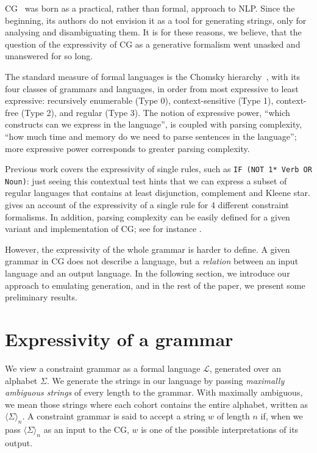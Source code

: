 \documentclass[11pt]{article}
\def\maxAmb#1{$\langle \Sigma \rangle_#1$}
\begin{document}
CG~\cite{karlsson1995constraint} was born as a practical, rather than formal, 
approach to NLP. 
Since the beginning, its authors do not envision it as a tool for 
generating strings, only for analysing and disambiguating them.
It is for these reasons, we believe, that the question of the expressivity of CG
as a generative formalism went unasked and unanswered for so long.

The standard measure of formal languages is the Chomsky hierarchy~\cite{chomsky1956hierarchy}, with its four
classes of grammars and languages, in order from most expressive to least expressive:
recursively enumerable (Type 0), context-sensitive (Type 1), context-free (Type 2), and
regular (Type 3).
The notion of expressive power, ``which constructs can we express in the language'', is coupled with parsing complexity, ``how much time and memory do we need to parse sentences in the language''; more expressive power corresponds to greater parsing complexity.

Previous work covers the expressivity of single rules, such as \texttt{IF (NOT 1* Verb OR Noun)}: 
just seeing this contextual test hints that we can express a subset of 
regular languages that contains at least disjunction, complement and 
Kleene star.  gives an account of the expressivity of 
a single rule for 4 different constraint formalisms. In addition, parsing 
complexity can be easily defined for a given variant and implementation of CG; 
see for instance .

However, the expressivity of the whole grammar is harder to define. 
A given grammar in CG does not describe a language, but a \emph{relation} 
between an input language and an output language. In the following section, 
we introduce our approach to emulating generation, and in the rest of the 
paper, we present some preliminary results.

\section{Expressivity of a grammar}

We view a constraint grammar as a formal language $\mathcal{L}$, generated over an 
alphabet $\Sigma$. We generate the strings in our language by passing \emph{maximally 
ambiguous strings} of every length to the grammar. 
With maximally ambiguous, we mean those strings where each cohort contains the 
entire alphabet, written as \maxAmb{n}. 
A constraint grammar is said to accept a string $w$ of length $n$ if, 
when we pass \maxAmb{n} as an input to the CG,
$w$ is one of the possible interpretations of its output.
\end{document}
